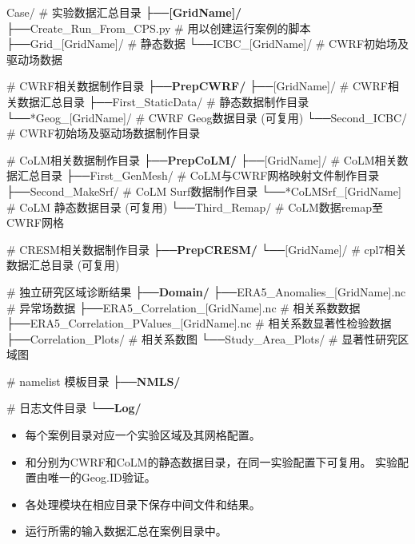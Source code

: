 \documentclass[UTF8,a4paper,11pt,fontset=none]{ctexart}
\begin{document}
\begin{CPSCode} [leftmargin=2em,commandchars=\\\{\}]
    Case/
    # 实验数据汇总目录
    ├──\textbf{\large{[GridName]/}}                              
        ├──Create_Run_From_CPS.py                 # 用以创建运行案例的脚本
        ├──Grid_[GridName]/                       # 静态数据
        └──ICBC_[GridName]/                       # CWRF初始场及驱动场数据

    # CWRF相关数据制作目录
    ├──\textbf{\large{PrepCWRF/}}                                  
        ├──[GridName]/                            # CWRF相关数据汇总目录
        ├──First_StaticData/                      # 静态数据制作目录
            └──*Geog_[GridName]/                  # CWRF Geog数据目录 (可复用)
        └──Second_ICBC/                           # CWRF初始场及驱动场数据制作目录
    
    # CoLM相关数据制作目录
    ├──\textbf{\large{PrepCoLM/}}                                  
        ├──[GridName]/                            # CoLM相关数据汇总目录
        ├──First_GenMesh/                         # CoLM与CWRF网格映射文件制作目录
        ├──Second_MakeSrf/                        # CoLM Surf数据制作目录
            └──*CoLMSrf_[GridName]                # CoLM 静态数据目录 (可复用)
        └──Third_Remap/                           # CoLM数据remap至CWRF网格
    
    # CRESM相关数据制作目录
    ├──\textbf{\large{PrepCRESM/}}                                  
        └──[GridName]/                            # cpl7相关数据汇总目录 (可复用)
    
    # 独立研究区域诊断结果
    ├──\textbf{\large{Domain/}}                                  
        ├──ERA5_Anomalies_[GridName].nc           # 异常场数据
        ├──ERA5_Correlation_[GridName].nc         # 相关系数数据
        ├──ERA5_Correlation_PValues_[GridName].nc # 相关系数显著性检验数据
        ├──Correlation_Plots/                     # 相关系数图
        └──Study_Area_Plots/                      # 显著性研究区域图
    
    # namelist 模板目录
    ├──\textbf{\large{NMLS/ }}                                    
    
    # 日志文件目录
    └──\textbf{\large{Log/ }}                                     
\end{CPSCode}

\begin{CPSNote}[Tips]
    \begin{itemize}[leftmargin=2em]
        \item 每个案例目录对应一个实验区域及其网格配置。
        \item {} 和分别为CWRF和CoLM的静态数据目录，在同一实验配置下可复用。 实验配置由唯一的Geog.ID验证。
        \item 各处理模块在相应目录下保存中间文件和结果。
        \item 运行所需的输入数据汇总在案例目录中。
    \end{itemize}
\end{CPSNote}
\end{document}
